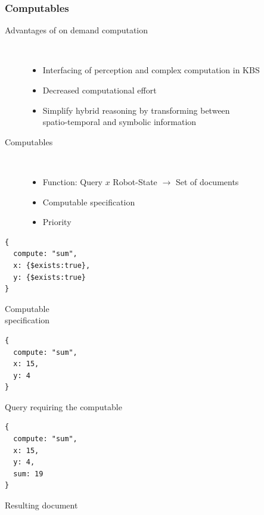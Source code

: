 \begin{frame}[fragile]
  \frametitle{Computables}
  \begin{description}
  \item[Advantages of on demand computation]%
                \hfill \\
    \begin{itemize}
    \item Interfacing of perception and complex computation in KBS %
    \item Decreased computational effort %
    \item Simplify hybrid reasoning by transforming between\\ spatio-temporal and symbolic information
    \end{itemize}
  \item[Computables]%
                \hfill \\
    \begin{itemize}
    \item Function: Query $x$ Robot-State $\rightarrow$ Set of documents
    \item Computable specification
    \item Priority %
    \end{itemize}
  \end{description}

\begin{minipage}[b]{.27\textwidth}
\begin{lstlisting}[style=ReallySmallJSON,
  framexleftmargin=5pt, xleftmargin=0pt,
 morekeywords={}, numbers=none]
{
  compute: "sum",
  x: {$exists:true},
  y: {$exists:true}
}
\end{lstlisting}
Computable\\specification
\end{minipage}%
\hfill
\begin{minipage}[b]{.25\textwidth}
\begin{lstlisting}[style=ReallySmallJSON,
  framexleftmargin=5pt, xleftmargin=0pt,
 morekeywords={}, numbers=none]
{
  compute: "sum",
  x: 15,
  y: 4
}
\end{lstlisting}
Query requiring the computable
\end{minipage}%
\hfill
\begin{minipage}[b]{.25\textwidth}
\begin{lstlisting}[style=ReallySmallJSON,
  framexleftmargin=5pt, xleftmargin=0pt,
 morekeywords={}, numbers=none]
{
  compute: "sum",
  x: 15,
  y: 4,
  sum: 19
}
\end{lstlisting}
  \vspace{-0.1cm}
Resulting document
\end{minipage}%
\end{frame}

